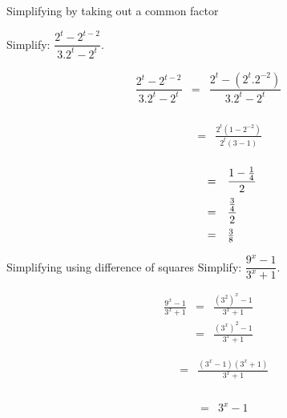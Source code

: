\begin{wex}
{%
Simplifying by taking out a common factor
}
{%
Simplify: $\dfrac{2^t-2^{t-2}}{3.2^t-2^t}. $

}
{%
\begin{eqnarray*}
\dfrac{2^t-2^{t-2}}{3.2^t-2^t} & = & \dfrac{2^t-(2^t.2^{-2})}{3.2^t-2^t} \\
\end{eqnarray*}


\begin{eqnarray*}
\phantom{\frac{2^t-2^{t-2}}{3.2^t-2^t}}  & = & \frac{2^t(1-2^{-2})}{2^t(3-1)} \\
\end{eqnarray*}



\begin{equation*}
 \begin{array}{rcl}
 \phantom{\frac{2^t-2^{t-2}}{3.2^t-2^t}}  & = & \dfrac{1- \frac{1}{4}}{2} \vspace{5pt}\\
					     & = & \dfrac{\frac{3}{4}}{2} \vspace{5pt}\\
					     & = & \frac{3}{8} 
 \end{array}

\end{equation*}




} 
\end{wex}




\begin{wex}
{
Simplifying using difference of squares
}
{
Simplify: 
$ \dfrac{9^x-1}{3^x+1}. $
}
{
\begin{eqnarray*}
 \frac{9^x-1}{3^x+1} & = & \frac{(3^2)^x -1}{3^x+1} \\
		     & = & \frac{(3^x)^2-1}{3^x+1} 
\end{eqnarray*}


\begin{eqnarray*}
 \phantom{\frac{9^x-1}{3^x+1}} & = & \frac{(3^x-1)(3^x+1)}{3^x+1}\\
\end{eqnarray*}


\begin{eqnarray*}
 \phantom{\frac{9^x-1}{3^x+1}} & = & 3^x-1\\
\end{eqnarray*}

}
\end{wex}


